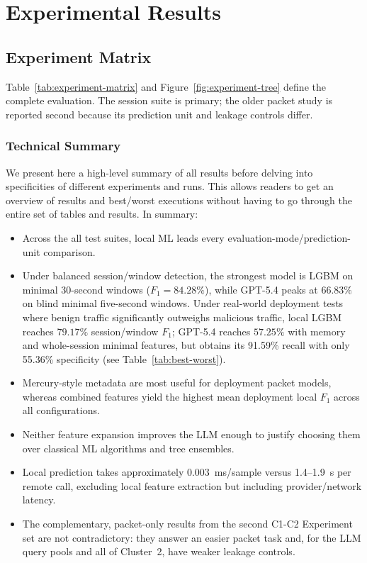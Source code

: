 \documentclass[letterpaper,twocolumn,10pt]{article}
\begin{document}
\section{Experimental Results}
\label{sec:results}

\subsection{Experiment Matrix}

Table~\ref{tab:experiment-matrix} and Figure~\ref{fig:experiment-tree} define the complete evaluation. The session suite is primary; the older packet study is reported second because its prediction unit and leakage controls differ.

\subsubsection{Technical Summary}
We present here a high-level summary of all results before delving into specificities of different experiments and runs. This allows readers to get an overview of results and best/worst executions without having to go through the entire set of tables and results. In summary:
\begin{itemize}
    \item Across the all test suites, local ML leads every evaluation-mode/prediction-unit comparison. 
    \item Under balanced session/window detection, the strongest model is LGBM on minimal 30-second windows ($F_1=84.28\%$), while GPT-5.4 peaks at $66.83\%$ on blind minimal five-second windows. Under real-world deployment tests where benign traffic significantly outweighs malicious traffic, local LGBM reaches $79.17\%$ session/window $F_1$; GPT-5.4 reaches $57.25\%$ with memory and whole-session minimal features, but obtains its 91.59\% recall with only 55.36\% specificity (see Table~\ref{tab:best-worst}). 
    \item Mercury-style metadata are most useful for deployment packet models, whereas combined features yield the highest mean deployment local $F_1$ across all configurations.
    \item Neither feature expansion improves the LLM enough to justify choosing them over classical ML algorithms and tree ensembles. 
    \item Local prediction takes approximately 0.003~ms/sample versus 1.4--1.9~s per remote call, excluding local feature extraction but including provider/network latency. 
    \item The complementary, packet-only results from the second C1-C2 Experiment set are not contradictory: they answer an easier packet task and, for the LLM query pools and all of Cluster~2, have weaker leakage controls.
\end{itemize}
\end{document}
